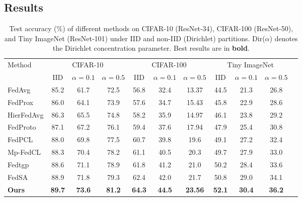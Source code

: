 \documentclass[twoside]{article}
\begin{document}
    \subsection{Results}
        \begin{table}[!htbp]
        \centering
        \caption{Test accuracy (\%) of different methods on CIFAR-10 (ResNet-34), CIFAR-100 (ResNet-50), 
        and Tiny ImageNet (ResNet-101) under IID and non-IID (Dirichlet) partitions. 
        Dir($\alpha$) denotes the Dirichlet concentration parameter. Best results are in \textbf{bold}.}
        \label{tab:main_results}
        \begin{tabular}{lcccccccccc}
        \toprule
        \multirow{2}{*}{Method} & \multicolumn{3}{c}{CIFAR-10} & \multicolumn{3}{c}{CIFAR-100} & \multicolumn{3}{c}{Tiny ImageNet} \\
         & IID & 
         $\alpha{=}0.1$ & 
         $\alpha{=}0.5$ & 
         IID & 
         $\alpha{=}0.1$ & 
         $\alpha{=}0.5$ & 
         IID & 
         $\alpha{=}0.1$ & 
         $\alpha{=}0.5$ \\
        \midrule
        FedAvg     & 85.2 & 61.7 & 72.5 & 56.8 & 32.4 & 13.37 & 44.5 & 21.3 & 26.8 \\
        FedProx    & 86.0 & 64.1 & 73.9 & 57.6 & 34.7 & 15.43 & 45.8 & 22.9 & 28.6 \\
        HierFedAvg & 86.3 & 65.5 & 74.8 & 58.2 & 35.9 & 14.97 & 46.1 & 23.8 & 29.2 \\
        FedProto   & 87.1 & 67.2 & 76.1 & 59.4 & 37.6 & 17.94 & 47.9 & 25.4 & 30.8 \\
        FedPCL     & 88.0 & 69.8 & 77.5 & 60.7 & 39.8 & 19.6  & 49.1 & 27.2 & 32.4 \\
        Mp-FedCL   & 88.3 & 70.4 & 78.2 & 61.1 & 40.5 & 20.3  & 49.7 & 27.9 & 33.0 \\
        Fedtgp     & 88.6 & 71.1 & 78.9 & 61.8 & 41.2 & 21.0  & 50.2 & 28.4 & 33.6 \\
        FedSA      & 88.9 & 71.8 & 79.3 & 62.4 & 42.0 & 21.7  & 50.8 & 29.0 & 34.1 \\
        \midrule
        \textbf{Ours} & \textbf{89.7} & \textbf{73.6} & \textbf{81.2} & \textbf{64.3} & \textbf{44.5} & \textbf{23.56} & \textbf{52.1} & \textbf{30.4} & \textbf{36.2} \\
        \bottomrule
        \end{tabular}
        \end{table}
        
\end{document}
